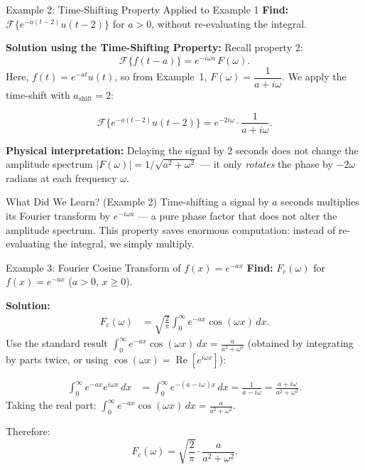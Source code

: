 \documentclass[12pt,a4paper]{article}
\begin{document}
\vspace{0.8em}

\begin{infobox}{Example 2: Time-Shifting Property Applied to Example 1}
\textbf{Find:} $\mathcal{F}\{e^{-a(t-2)}u(t-2)\}$ for $a > 0$, without re-evaluating the integral.

\textbf{Solution using the Time-Shifting Property:}
Recall property 2:
\[
  \mathcal{F}\{f(t-a)\} = e^{-i\omega a}\,F(\omega).
\]
Here, $f(t) = e^{-at}u(t)$, so from Example~1, $F(\omega) = \dfrac{1}{a + i\omega}$.
We apply the time-shift with $a_{\text{shift}} = 2$:

\[
  \mathcal{F}\{e^{-a(t-2)}u(t-2)\} = e^{-2i\omega} \cdot \frac{1}{a + i\omega}.
\]

\textbf{Physical interpretation:} Delaying the signal by $2$ seconds does not change the amplitude spectrum
$|F(\omega)| = 1/\sqrt{a^2+\omega^2}$ --- it only \emph{rotates} the phase by $-2\omega$ radians at each
frequency $\omega$.
\end{infobox}

\begin{learnbox}{What Did We Learn? (Example 2)}
Time-shifting a signal by $a$ seconds multiplies its Fourier transform by $e^{-i\omega a}$ ---
a pure phase factor that does not alter the amplitude spectrum.
This property saves enormous computation: instead of re-evaluating the integral, we simply multiply.
\end{learnbox}

\vspace{0.8em}

\begin{infobox}{Example 3: Fourier Cosine Transform of $f(x) = e^{-ax}$}
\textbf{Find:} $F_c(\omega)$ for $f(x) = e^{-ax}$ ($a>0$, $x \geq 0$).

\textbf{Solution:}
\begin{align*}
F_c(\omega)
  &= \sqrt{\frac{2}{\pi}}\int_0^\infty e^{-ax}\cos(\omega x)\,dx.
\end{align*}
Use the standard result
$\displaystyle\int_0^\infty e^{-ax}\cos(\omega x)\,dx = \frac{a}{a^2+\omega^2}$
(obtained by integrating by parts twice, or using $\cos(\omega x) = \operatorname{Re}[e^{i\omega x}]$):

\begin{align*}
\int_0^\infty e^{-ax}e^{i\omega x}\,dx
  &= \int_0^\infty e^{-(a-i\omega)x}\,dx
   = \frac{1}{a - i\omega}
   = \frac{a+i\omega}{a^2+\omega^2}.
\end{align*}
Taking the real part: $\displaystyle\int_0^\infty e^{-ax}\cos(\omega x)\,dx = \frac{a}{a^2+\omega^2}$.

Therefore:
\[
  F_c(\omega) = \sqrt{\frac{2}{\pi}} \cdot \frac{a}{a^2+\omega^2}.
\]
\end{infobox}
\end{document}

